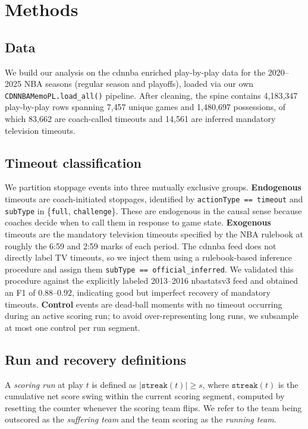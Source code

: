 \documentclass[twoside,11pt]{article}
\begin{document}
\section{Methods}

\subsection{Data}

We build our analysis on the cdnnba enriched play-by-play data for the 2020--2025 NBA seasons (regular
season and playoffs), loaded via our own \texttt{CDNNBAMemoPL.load\_all()} pipeline. After cleaning, the
spine contains 4{,}183{,}347 play-by-play rows spanning 7{,}457 unique games and 1{,}480{,}697 possessions,
of which 83{,}662 are coach-called timeouts and 14{,}561 are inferred mandatory television timeouts.

\subsection{Timeout classification}

We partition stoppage events into three mutually exclusive groups. \textbf{Endogenous} timeouts are
coach-initiated stoppages, identified by \texttt{actionType == timeout} and \texttt{subType} in
\{\texttt{full}, \texttt{challenge}\}. These are endogenous in the causal sense because coaches decide when to
call them in response to game state. \textbf{Exogenous} timeouts are the mandatory television timeouts
specified by the NBA rulebook at roughly the 6:59 and 2:59 marks of each period. The cdnnba feed does not
directly label TV timeouts, so we inject them using a rulebook-based inference procedure and assign them
\texttt{subType == official\_inferred}. We validated this procedure against the explicitly labeled 2013--2016
nbastatsv3 feed and obtained an F1 of $0.88$--$0.92$, indicating good but imperfect recovery of mandatory
timeouts. \textbf{Control} events are dead-ball moments with no timeout occurring during an active scoring
run; to avoid over-representing long runs, we subsample at most one control per run segment.

\subsection{Run and recovery definitions}

A \emph{scoring run} at play $t$ is defined as $|\texttt{streak}(t)| \geq s$, where $\texttt{streak}(t)$ is
the cumulative net score swing within the current scoring segment, computed by resetting the counter whenever
the scoring team flips. We refer to the team being outscored as the \emph{suffering team} and the team
scoring as the \emph{running team}.
\end{document}
